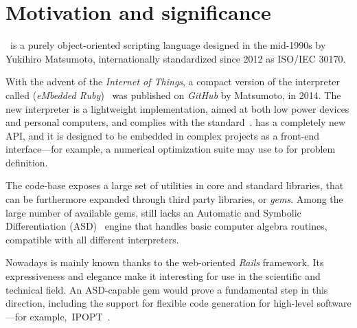 
\section{Motivation and significance}
\label{sec:motivation}

\Ruby \cite{flanagan2008ruby}~is a purely object-oriented scripting language designed in the mid-1990s by Yukihiro Matsumoto, internationally standardized since 2012 as ISO/IEC 30170.

With the advent of the \emph{Internet of Things}, a compact version of the \Ruby interpreter called \Mruby (\emph{eMbedded Ruby})~\cite{tanaka2015mruby} was published on \emph{GitHub} by Matsumoto, in 2014. The new interpreter is a lightweight implementation, aimed at both low power devices and personal computers, and complies with the standard~\cite{iso30170}. \Mruby has a completely new API, and it is designed to be embedded in complex projects as a front-end interface---for example, a numerical optimization suite may use \Mruby to for problem definition.

The \Ruby code-base exposes a large set of utilities in core and standard libraries, that can be furthermore expanded through third party libraries, or \emph{gems}. Among the large number of available gems, \Ruby still lacks an Automatic and Symbolic Differentiation (ASD)~\cite{tolsma1998computational} engine that handles basic computer algebra routines, compatible with all different \Ruby interpreters.

Nowadays \Ruby is mainly known thanks to the web-oriented \emph{Rails} framework. Its expressiveness and elegance make it interesting for use in the scientific and technical field. An ASD-capable gem would prove a fundamental step in this direction, including the support for flexible code generation for high-level software---for example,\ IPOPT~\cite{wachter2009ipopt, wachter2006}\@.


